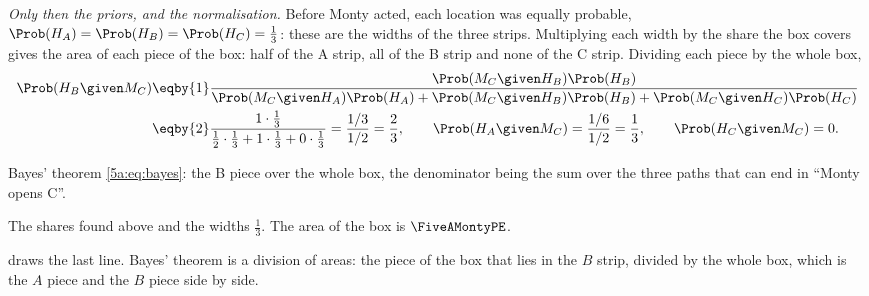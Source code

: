 \emph{Only then the priors, and the normalisation.} Before Monty acted, each
location was equally probable, $\Prob(H_A)=\Prob(H_B)=\Prob(H_C)=\frac13$: these are
the widths of the three strips. Multiplying each width by the share the box covers
gives the area of each piece of the box: half of the A strip, all of the B strip
and none of the C strip. Dividing each piece by the whole box,
\begin{align*}
  \Prob(H_B\given M_C)
  &\eqby{1}\frac{\Prob(M_C\given H_B)\Prob(H_B)}
     {\Prob(M_C\given H_A)\Prob(H_A)+\Prob(M_C\given H_B)\Prob(H_B)+\Prob(M_C\given H_C)\Prob(H_C)}\\
  &\eqby{2}\frac{1\cdot\tfrac13}{\tfrac12\cdot\tfrac13+1\cdot\tfrac13+0\cdot\tfrac13}
  =\frac{1/3}{1/2}=\frac23,
  \qquad \Prob(H_A\given M_C)=\frac{1/6}{1/2}=\frac13,\qquad \Prob(H_C\given M_C)=0 .
\end{align*}
\begin{explain}
  \item Bayes' theorem \eqref{5a:eq:bayes}: the B piece over the whole box, the
        denominator being the sum over the three paths
        that can end in ``Monty opens C''.
  \item The shares found above and the widths $\frac13$. The area of the box is
        $\FiveAMontyPE$.
\end{explain}

 draws the last line. Bayes' theorem is a division of areas:
the piece of the box that lies in the $B$ strip, divided by the whole box, which is
the $A$ piece and the $B$ piece side by side.

